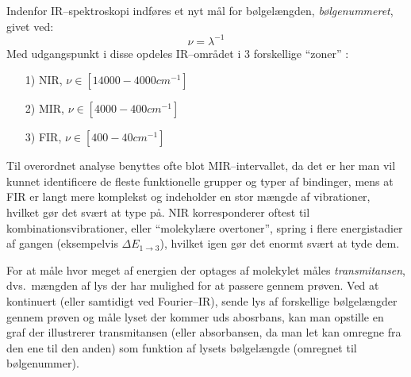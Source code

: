     Indenfor IR--spektroskopi indføres et nyt mål for bølgelængden, \textit{bølgenummeret}, givet ved:
    \[
        \nu=\lambda^{-1}
    \]
    Med udgangspunkt i disse opdeles IR--området i 3 forskellige ``zoner'' \parencite{Shah2018}:
    \begin{itemize}
        \item[1)] NIR, $\nu \in \left[14000-4000\si{cm^{-1}}\right]$
        \item[2)] MIR, $\nu \in \left[4000-400\si{cm^{-1}}\right]$
        \item[3)] FIR, $\nu \in \left[400-40\si{cm^{-1}}\right]$
    \end{itemize}
    Til overordnet analyse benyttes ofte blot MIR--intervallet, da det er her man vil kunnet identificere de fleste funktionelle grupper og typer af bindinger, mens at FIR er langt mere komplekst og indeholder en stor mængde af vibrationer, hvilket gør det svært at type på. NIR korresponderer oftest til kombinationsvibrationer, eller ``molekylære overtoner'', spring i flere energistadier af gangen (eksempelvis $\Delta E_{1\rightarrow 3}$), hvilket igen gør det enormt svært at tyde dem.
    \begin{table}[H]\centering
        \caption{Bølgernummerintervaller for nogle karakteristiske funktionelle grupper \parencite{Geor2004}.}
    \end{table}
    For at måle hvor meget af energien der optages af molekylet måles \textit{transmitansen}, dvs.\ mængden af lys der har mulighed for at passere gennem prøven. Ved at kontinuert (eller samtidigt ved Fourier--IR), sende lys af forskellige bølgelængder gennem prøven og måle lyset der kommer uds abosrbans, kan man opstille en graf der illustrerer transmitansen (eller absorbansen, da man let kan omregne fra den ene til den anden) som funktion af lysets bølgelængde (omregnet til bølgenummer). 
